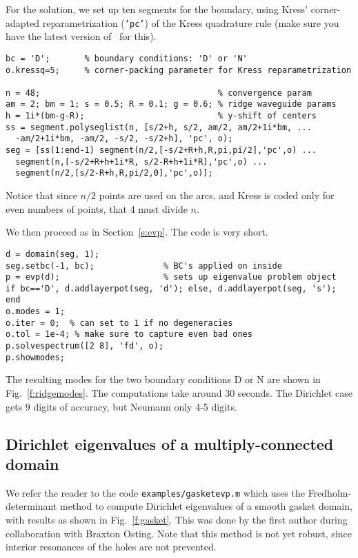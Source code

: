 For the solution, we set up ten segments for the boundary,
using Kress' corner-adapted reparametrization ({\tt 'pc'}) of the Kress
quadrature rule (make sure you have the latest version of \mpspack\
for this).
\begin{verbatim}
bc = 'D';       % boundary conditions: 'D' or 'N'
o.kressq=5;     % corner-packing parameter for Kress reparametrization

n = 48;                                    % convergence param
am = 2; bm = 1; s = 0.5; R = 0.1; g = 0.6; % ridge waveguide params
h = 1i*(bm-g-R);                           % y-shift of centers
ss = segment.polyseglist(n, [s/2+h, s/2, am/2, am/2+1i*bm, ...
  -am/2+1i*bm, -am/2, -s/2, -s/2+h], 'pc', o);
seg = [ss(1:end-1) segment(n/2,[-s/2+R+h,R,pi,pi/2],'pc',o) ...
  segment(n,[-s/2+R+h+1i*R, s/2-R+h+1i*R],'pc',o) ...
  segment(n/2,[s/2-R+h,R,pi/2,0],'pc',o)];
\end{verbatim}
Notice that since $n/2$ points are used on the arcs, and Kress is coded
only for even numbers of points, that 4 must divide $n$.

We then proceed as in Section~\ref{s:evp}. The code is very short.
\begin{verbatim}
d = domain(seg, 1);
seg.setbc(-1, bc);              % BC's applied on inside
p = evp(d);                     % sets up eigenvalue problem object
if bc=='D', d.addlayerpot(seg, 'd'); else, d.addlayerpot(seg, 's'); end
o.modes = 1;
o.iter = 0;  % can set to 1 if no degeneracies
o.tol = 1e-4; % make sure to capture even bad ones
p.solvespectrum([2 8], 'fd', o);
p.showmodes;
\end{verbatim}
The resulting modes for the two boundary conditions D or N are shown
in Fig.~\ref{f:ridgemodes}.
The computations take around 30 seconds.
The Dirichlet case gets 9 digits of accuracy, but Neumann only 4-5 digits.





\bfi %
\ig{width=\textwidth}{figs/gasket.eps}
\efi

\subsection{Dirichlet eigenvalues of a multiply-connected domain}
\label{s:gasket}

We refer the reader to the code {\tt examples/gasketevp.m} which uses
the Fredholm-determinant method to compute Dirichlet eigenvalues
of a smooth gasket domain, with results as shown in Fig.~\ref{f:gasket}.
This was done by the first author during collaboration with Braxton Osting.
Note that this method is not yet robust, since interior resonances
of the holes are not prevented.



